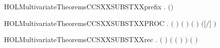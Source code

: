 \newcommand{\HOLMultivariateTheoremsCCSXXSUBSTXXpar}{\UseVerbatim{HOLMultivariateTheoremsCCSXXSUBSTXXpar}}
\begin{SaveVerbatim}{HOLMultivariateTheoremsCCSXXSUBSTXXprefix}
\HOLTokenTurnstile{} \HOLSymConst{\HOLTokenForall{}}  .   \ensuremath{(}\HOLSymConst{\ensuremath{\ldotp}}\ensuremath{)} \HOLSymConst{\ensuremath{=}} \HOLSymConst{\ensuremath{\ldotp}}  
\end{SaveVerbatim}
\newcommand{\HOLMultivariateTheoremsCCSXXSUBSTXXprefix}{\UseVerbatim{HOLMultivariateTheoremsCCSXXSUBSTXXprefix}}
\begin{SaveVerbatim}{HOLMultivariateTheoremsCCSXXSUBSTXXPROC}
\HOLTokenTurnstile{} \HOLSymConst{\HOLTokenForall{}}  .
       \ensuremath{(}  \HOLSymConst{\ensuremath{=}}  \ensuremath{)} \HOLSymConst{\HOLTokenConj{}}  \ensuremath{(} \ensuremath{)} \ensuremath{(} \ensuremath{)} \HOLSymConst{\HOLTokenConj{}}
         \HOLSymConst{\HOLTokenImp{}}
       \ensuremath{(}\ensuremath{[}\ensuremath{/}\ensuremath{]}  \HOLSymConst{\ensuremath{=}} \ensuremath{)}
\end{SaveVerbatim}
\newcommand{\HOLMultivariateTheoremsCCSXXSUBSTXXPROC}{\UseVerbatim{HOLMultivariateTheoremsCCSXXSUBSTXXPROC}}
\begin{SaveVerbatim}{HOLMultivariateTheoremsCCSXXSUBSTXXrec}
\HOLTokenTurnstile{} \HOLSymConst{\HOLTokenForall{}}  .
         \ensuremath{(}  \ensuremath{)} \HOLSymConst{\ensuremath{=}}
         \HOLConst{\HOLTokenIn{}}      \ensuremath{(} \ensuremath{(} \HOLSymConst{\ensuremath{\setminus}} \ensuremath{)} \ensuremath{)}
          \ensuremath{(}  \ensuremath{)}
\end{SaveVerbatim}
\newcommand{\HOLMultivariateTheoremsCCSXXSUBSTXXrec}{\UseVerbatim{HOLMultivariateTheoremsCCSXXSUBSTXXrec}}
